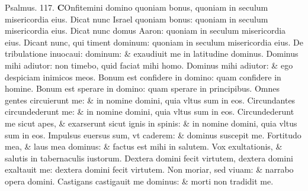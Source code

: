 \documentclass[a5paper,10pt]{book}
\begin{document}
\begin{multicols*}{2}
\newline \color{red} Psalmus. 117. \color{black}
\lettrine[lines=2]{\bfseries \color{red} C}{}Onfitemini domino quoniam bonus, quoniam in seculum misericordia eius.
\newline \color{red} D\color{black}icat nunc Israel quoniam bonus: quoniam in seculum misericordia eius.
\newline \color{red} D\color{black}icat nunc domus Aaron: quoniam in seculum misericordia eius.
\newline \color{red} D\color{black}icant nunc, qui timent dominum: quoniam in seculum misericordia eius.
\newline \color{red} D\color{black}e tribulatione inuocaui: dominum: \& exaudiuit me in latitudine dominus.
\newline \color{red} D\color{black}ominus mihi adiutor: non timebo, quid faciat mihi homo.
\newline \color{red} D\color{black}ominus mihi adiutor: \& ego despiciam inimicos meos.
\newline \color{red} B\color{black}onum est confidere in domino: quam confidere in homine.
\newline \color{red} B\color{black}onum est sperare in domino: quam sperare in principibus.
\newline \color{red} O\color{black}mnes gentes circuierunt me: \& in nomine domini, quia vltus sum in eos.
\newline \color{red} C\color{black}ircundantes circundederunt me: \& in nomine domini, quia vltus sum in eos.
\newline \color{red} C\color{black}ircundederunt me sicut apes, \& exarserunt sicut ignis in spinis: \& in nomine domini, quia vltus sum in eos.
\newline \color{red} I\color{black}mpulsus euersus sum, vt caderem: \& dominus suscepit me.
\newline \color{red} F\color{black}ortitudo mea, \& laus mea dominus: \& factus est mihi in salutem.
\newline \color{red} V\color{black}ox exultationis, \& salutis in tabernaculis iustorum.
\newline \color{red} D\color{black}extera domini fecit virtutem, dextera domini exaltauit me: dextera domini fecit virtutem.
\newline \color{red} N\color{black}on moriar, sed viuam: \& narrabo opera domini.
\newline \color{red} C\color{black}astigans castigauit me dominus: \& morti non tradidit me.

\end{multicols*}
\end{document}
